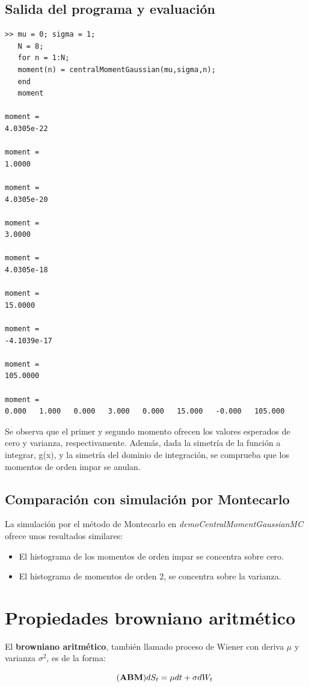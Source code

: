 \documentclass[a4paper,11pt]{article}
\begin{document}
\subsection{Salida del programa y evaluaci\'on}

\begin{lstlisting}
>> mu = 0; sigma = 1;
   N = 8;
   for n = 1:N;
   moment(n) = centralMomentGaussian(mu,sigma,n);
   end
   moment

moment =
4.0305e-22

moment =
1.0000

moment =
4.0305e-20

moment =
3.0000

moment =
4.0305e-18

moment =
15.0000

moment =
-4.1039e-17

moment =
105.0000

moment =
0.000   1.000   0.000   3.000   0.000   15.000   -0.000   105.000
\end{lstlisting}

Se observa que el primer y segundo momento ofrecen los valores esperados de cero y
varianza, respectivamente. Adem\'as, dada la simetr\'ia de la funci\'on a
integrar, g(x), y la simetr\'ia del dominio de integraci\'on, se comprueba que
los momentos de orden impar se anulan.

\subsection{Comparaci\'on con simulaci\'on por Montecarlo}
La simulaci\'on por el m\'etodo de Montecarlo en \textit{demoCentralMomentGaussianMC}
ofrece unos resultados similares:
\begin{itemize}
   \item El histograma de los momentos de orden impar se concentra sobre cero.
   \item El histograma de momentos de orden 2, se concentra sobre la varianza.
\end{itemize}

\pagebreak
\section{Propiedades browniano aritm\'etico}
El \textbf{browniano aritm\'etico}, tambi\'en llamado proceso de Wiener con deriva $\mu$ y
varianza $\sigma^2$, es de la forma:

\begin{equation*}
   \tag{\textbf{ABM}}
   dS_t = \mu dt + \sigma dW_t
\end{equation*}
\end{document}
